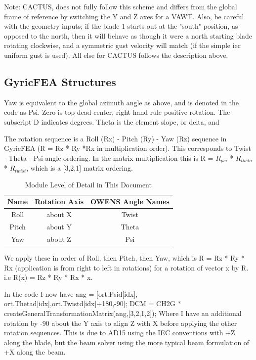 \documentclass[11pt]{article}
\begin{document}
Note: CACTUS, does not fully follow this scheme and differs from the global frame of reference by switching the Y and Z axes for a VAWT.  Also, be careful with the geometry inputs; if the blade 1 starts out at the "south" position, as opposed to the north, then it will behave as though it were a north starting blade rotating clockwise, and a symmetric gust velocity will match (if the simple iec uniform gust is used).  All else for CACTUS follows the description above.

\subsection{GyricFEA Structures}

Yaw is equivalent to the global azimuth angle as above, and is denoted in the code as Psi. Zero is top dead center, right hand rule positive rotation.  The subscript D indicates degrees.  Theta is the element slope, or delta, and 

The rotation sequence is a Roll (Rx) - Pitch (Ry) - Yaw (Rz) sequence in GyricFEA (R = Rz * Ry *Rx in multiplication order). This corresponds to Twist - Theta - Psi angle ordering.  In the matrix multiplication this is R = $R_{psi}$ * $R_{theta}$ * $R_{twist}$, which is a [3,2,1] matrix ordering.
 
\begin{table}[htbp!]
\begin{center}
\caption{Module Level of Detail in This Document}
\begin{tabular}{| c | c | c |}
\hline
Name         &           Rotation Axis       &               OWENS Angle Names\\
\hline
Roll           &              about X          &                       Twist\\
Pitch              &        about Y            &                     Theta\\
Yaw               &         about Z                &                 Psi\\
\hline
\end{tabular}
\end{center}
\end{table}
 

 
We apply these in order of Roll, then Pitch, then Yaw, which is R = Rz * Ry * Rx    (application is from right to left in rotations) for a rotation of vector x by R.  i.e  R(x)  = Rz * Ry * Rx * x.
 
In the code I now have
ang = [ort.Psid[idx], ort.Thetad[idx],ort.Twistd[idx]+180,-90];
DCM = CH2G * createGeneralTransformationMatrix(ang,[3,2,1,2]);
Where I have an additional rotation by -90 about the Y axis to align Z with X before applying the other rotation sequences.  This is due to AD15 using the IEC conventions with +Z along the blade, but the beam solver using the more typical beam formulation of +X along the beam.
 
\end{document}
